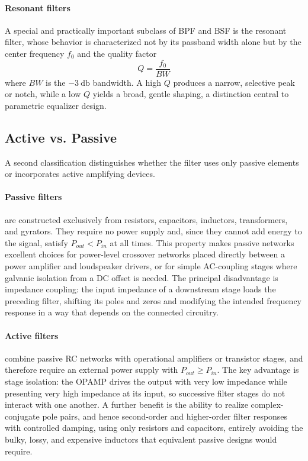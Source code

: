 \paragraph{Resonant filters} A special and practically important subclass of BPF and BSF is the resonant filter, whose behavior is characterized not by its passband width alone but by the center frequency \( f_0 \) and the quality factor
\[
Q = \frac{f_0}{BW}
\]
where \( BW \) is the \( -\SI{3}{\decibel} \) bandwidth.
A high \( Q \) produces a narrow, selective peak or notch, while a low \( Q \) yields a broad, gentle shaping, a distinction central to parametric equalizer design.

\subsection{Active vs. Passive}
\label{sc:512}

A second classification distinguishes whether the filter uses only passive elements or incorporates active amplifying devices.

\paragraph{Passive filters} are constructed exclusively from resistors, capacitors, inductors, transformers, and gyrators.
They require no power supply and, since they cannot add energy to the signal, satisfy \( P_{out} < P_{in} \) at all times.
This property makes passive networks excellent choices for power-level crossover networks placed directly between a power amplifier and loudspeaker drivers, or for simple AC-coupling stages where galvanic isolation from a DC offset is needed.
The principal disadvantage is impedance coupling: the input impedance of a downstream stage loads the preceding filter, shifting its poles and zeros and modifying the intended frequency response in a way that depends on the connected circuitry.

\paragraph{Active filters} combine passive RC networks with operational amplifiers or transistor stages, and therefore require an external power supply with \( P_{out} \geq P_{in} \).
The key advantage is stage isolation: the OPAMP drives the output with very low impedance while presenting very high impedance at its input, so successive filter stages do not interact with one another.
A further benefit is the ability to realize complex-conjugate pole pairs, and hence second-order and higher-order filter responses with controlled damping, using only resistors and capacitors, entirely avoiding the bulky, lossy, and expensive inductors that equivalent passive designs would require.

